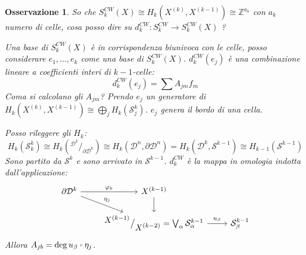 \documentclass[10pt, twoside=false, x11names]{scrbook}
\newtheorem{osservation}[theorem]{Osservazione}
\newcommand{\Z}{\mathbb{Z}}
\newcommand{\me}{\mathrm{e}}
\newcommand{\Sph}[1][]{\mathcal{S}^#1}
\newcommand{\Disk}[1][]{\mathcal{D}^#1}
\newcommand*\quot[2]{{^{\textstyle #1}\big/_{\textstyle #2}}}
\let\latexcirc=\circ
\newcommand{\ccirc}{\mathbin{\mathchoice
  {\xcirc\scriptstyle}
  {\xcirc\scriptstyle}
  {\xcirc\scriptscriptstyle}
  {\xcirc\scriptscriptstyle}
}}
\newcommand{\xcirc}[1]{\vcenter{\hbox{$#1\latexcirc$}}}
\let\circ\ccirc
\let\phi\varphi
\begin{document}
\begin{osservation}
  So che $ S_k^{CW}(X) \cong H_k(X^{(k)}, X^{(k-1)}) \cong \Z^{a_k} $ con $ a_k $ numero di celle,
  cosa posso dire su $ d_k^{CW} \colon S_k^{CW} \to S_k^{CW}(X) $ ?

  Una base di $ S_k^{CW}(X) $ è in corrispondenza biunivoca con le celle,
  posso considerare $ e_1, \dots, e_k $ come una base di $ S_k^{CW}(X) $.
  $ d_k^{CW}(e_j) $ è una combinazione lineare a coefficienti interi di $ k-1 $-celle:
  \[
    d^{CW}_k (e_j) = \sum A_{jm}f_m
  \]
  Coma si calcolano gli $ A_{jm} $?
  Prendo $ e_j $ un generatore di $ H_k(X^{(k)}, X^{(k-1)}) \cong \bigoplus_j H_k(\Sph{k}_j) $.
  $ e_j $ genera il bordo di una cella.

  Posso rileggere gli $ H_k $:
  \[
    H_k(\Sph{k}_k) \cong H_k(\quot{\Disk{k}}{\partial \Disk{k}}) \cong H_k(\Disk{n}, \partial \Disk{n}) =
    H_k(\Disk{k}, \Sph{k-1}) \cong H_{k-1}(\Sph{k-1})
  \]
  Sono partito da $ \Sph{k} $ e sono arrivato in $ \Sph{k-1} $.
  $ d_k^{CW} $ è la mappa in omologia indotta dall'applicazione:
  \[
    \begin{tikzcd}
      \partial \Disk{k} \rar{\phi_k} \arrow{dr}{\eta_j} & X^{(k-1)} \dar & {}\\
      {} & \quot{X^{(k-1)}}{X^{(k-2)}} = \bigvee_\alpha \Sph{k-1}_\alpha \rar{u_\beta} & \Sph{k-1}_\beta
    \end{tikzcd}
  \]
  Allora $ A_{jb} = \deg{u_\beta \circ \eta_j} $.
\end{osservation}



\printindex
\end{document}
